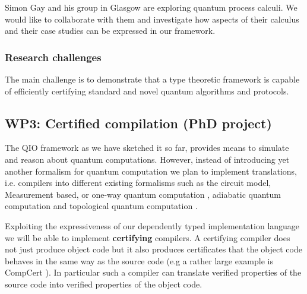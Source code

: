 \documentclass[a4paper]{article}
\begin{document}
Simon Gay and his group in Glasgow are exploring quantum process
calculi. We would like to collaborate with them and investigate how
aspects of their calculus and their case studies can be expressed in
our framework.


\subsubsection*{Research challenges}

The main challenge is to demonstrate that a type theoretic framework
is capable of efficiently certifying standard and novel quantum
algorithms and protocols. 

\subsection*{WP3: Certified compilation (PhD project)}
\label{sec:wp3}

The QIO framework as we have sketched it so far, provides means to
simulate and reason about quantum computations. However, instead of
introducing yet another formalism for quantum computation we plan to
implement translations, i.e. compilers into different existing
formalisms such as the circuit model, Measurement based, or one-way
quantum computation ,
adiabatic quantum computation  and topological quantum
computation .

Exploiting the expressiveness of our dependently typed implementation
language we will be able to implement \textbf{certifying} compilers.
A certifying compiler does not just produce object code but it also
produces certificates that the object code behaves in the same way as
the source code (e.g a rather large example is CompCert
). In particular such a compiler can translate verified
properties of the source code into verified properties of the object
code. 
\end{document}
